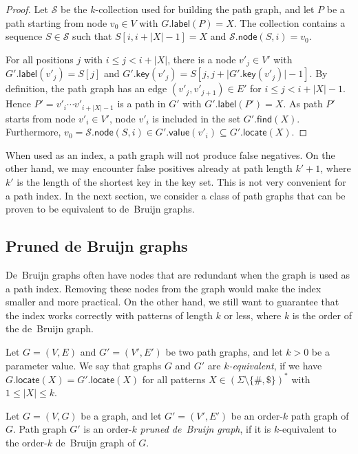 \documentclass[a4paper,UKenglish]{lipics-v2016}
\newcommand{\set}[1]{\ensuremath{\{ #1 \}}}
\newcommand{\abs}[1]{\ensuremath{\lvert #1 \rvert}}
\newcommand{\find}{\ensuremath{\mathsf{find}}}
\newcommand{\locate}{\ensuremath{\mathsf{locate}}}
\newcommand{\glabel}{\ensuremath{\mathsf{label}}}
\newcommand{\gkey}{\ensuremath{\mathsf{key}}}
\newcommand{\gvalue}{\ensuremath{\mathsf{value}}}
\newcommand{\gnode}{\ensuremath{\mathsf{node}}}
\newcommand{\kcollection}[1]{$#1$\nobreakdash-collection}
\newcommand{\kequivalent}[1]{$#1$\nobreakdash-equivalent}
\newcommand{\orderk}[1]{order\nobreakdash-$#1$}
\begin{document}
\begin{proof}
Let $\mathcal{S}$ be the \kcollection{k} used for building the path graph, and let $P$ be a path starting from node $v_{0} \in V$ with $G.\glabel(P) = X$. The collection contains a sequence $S \in \mathcal{S}$ such that $S[i, i+\abs{X}-1] = X$ and $\mathcal{S}.\gnode(S, i) = v_{0}$.

For all positions $j$ with $i \le j < i+\abs{X}$, there is a node $v'_{j} \in V'$ with $G'.\glabel(v'_{j}) = S[j]$ and $G'.\gkey(v'_{j}) = S[j, j+\abs{G'.\gkey(v'_{j})}-1]$.
By definition, the path graph has an edge $(v'_{j}, v'_{j+1}) \in E'$ for $i \le j < i+\abs{X}-1$.
Hence $P' = v'_{i} \dotsm v'_{i+\abs{X}-1}$ is a path in $G'$ with $G'.\glabel(P') = X$.
As path $P'$ starts from node $v'_{i} \in V'$, node $v'_{i}$ is included in the set $G'.\find(X)$.
Furthermore, $v_{0} = \mathcal{S}.\gnode(S, i) \in G'.\gvalue(v'_{i}) \subseteq G'.\locate(X)$.
\end{proof}

When used as an index, a path graph will not produce false negatives. On the other hand, we may encounter false positives already at path length $k'+1$, where $k'$ is the length of the shortest key in the key set. This is not very convenient for a path index. In the next section, we consider a class of path graphs that can be proven to be equivalent to de~Bruijn graphs.


\subsection{Pruned de Bruijn graphs}

De~Bruijn graphs often have nodes that are redundant when the graph is used as a path index. Removing these nodes from the graph would make the index smaller and more practical. On the other hand, we still want to guarantee that the index works correctly with patterns of length $k$ or less, where $k$ is the order of the de~Bruijn graph.

\begin{definition}
Let $G = (V, E)$ and $G' = (V', E')$ be two path graphs, and let $k > 0$ be a parameter value. We say that graphs $G$ and $G'$ are \emph{\kequivalent{k}}, if we have $G.\locate(X) = G'.\locate(X)$ for all patterns $X \in (\Sigma \setminus \set{\#, \$})^{\ast}$ with $1 \le \abs{X} \le k$.
\end{definition}

\begin{definition}
Let $G = (V, G)$ be a graph, and let $G' = (V', E')$ be an \orderk{k} path graph of $G$. Path graph $G'$ is an \orderk{k} \emph{pruned de~Bruijn graph}, if it is \kequivalent{k} to the \orderk{k} de~Bruijn graph of $G$.
\end{definition}
\end{document}
